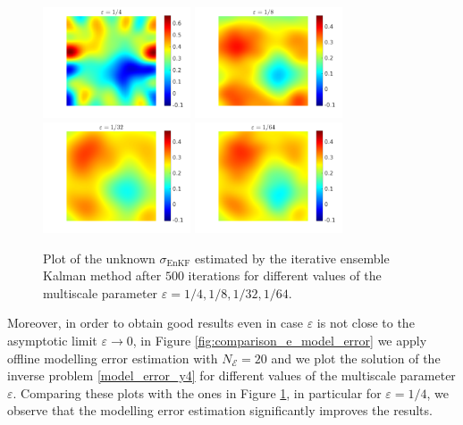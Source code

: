 \documentclass[10pt]{article}
\begin{document}
\begin{figure}[t]
\centering
\includegraphics[width = 0.39\textwidth]{figures/ensemble_500_e4}
\includegraphics[width = 0.39\textwidth]{figures/ensemble_500_e8}
\\
\includegraphics[width = 0.39\textwidth]{figures/ensemble_500_e32}
\includegraphics[width = 0.39\textwidth]{figures/ensemble_500_e64}
\caption{Plot of the unknown $\sigma_{\mathrm{EnKF}}$ estimated by the iterative ensemble Kalman method after $500$ iterations for different values of the multiscale parameter $\varepsilon = 1/4, 1/8, 1/32, 1/64$.}
\label{fig:comparison_e}
\end{figure}

Moreover, in order to obtain good results even in case $\varepsilon$ is not close to the asymptotic limit $\varepsilon \to 0$, in Figure \ref{fig:comparison_e_model_error} we apply offline modelling error estimation with $N_{\mathcal{E}} = 20$ and we plot the solution of the inverse problem \eqref{model_error_y4} for different values of the multiscale parameter $\varepsilon$. Comparing these plots with the ones in Figure \ref{fig:comparison_e}, in particular for $\varepsilon = 1/4$, we observe that the modelling error estimation significantly improves the results.
\end{document}
